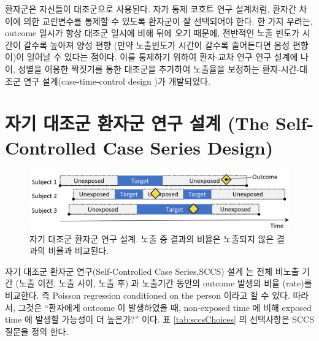 \documentclass[11pt]{book}
\theoremstyle{definition}
\theoremstyle{definition}
\theoremstyle{definition}
\theoremstyle{remark}
\begin{document}
환자군은 자신들이 대조군으로 사용된다. 자가 통제 코호트 연구 설계처럼,
환자간 차이에 의한 교란변수를 통제할 수 있도록 환자군이 잘 선택되어야
한다. 한 가지 우려는, outcome 일시가 항상 대조군 일시에 비해 뒤에 오기
때문에, 전반적인 노출 빈도가 시간이 갈수록 높아져 양성 편향 (만약
노출빈도가 시간이 갈수록 줄어든다면 음성 편향이)이 일어날 수 있다는
점이다. 이를 통제하기 위하여 환자-교차 연구 연구 설계에 나이, 성별을
이용한 짝짓기를 통한 대조군을 추가하여 노출율을 보정하는
환자-시간-대조군 연구 설계(case-time-control design
\citep{suissa_1995})가 개발되었다. 

\section{자기 대조군 환자군 연구 설계 (The Self-Controlled Case Series
Design)}\label{-----the-self-controlled-case-series-design}


\begin{figure}[h]

{\centering \includegraphics[width=0.9\linewidth]{images/PopulationLevelEstimation/selfControlledCaseSeries} 

}

\caption{자기 대조군 환자군 연구 설계. 노출 중 결과의 비율은 노출되지 않은 결과의 비율과 비교된다.}\label{fig:selfControlledCaseSeries}
\end{figure}

자기 대조군 환자군 연구(Self-Controlled Case Series,SCCS) 설계
\citep{farrington_1995, whitaker_2006}는 전체 비노출 기간 (노출 이전,
노출 사이, 노출 후) 과 노출기간 동안의 outcome 발생의 비율 (rate)를
비교한다. 즉 Poisson regression conditioned on the person 이라고 할 수
있다. 따라서, 그것은 ``환자에게 outcome 이 발생하였을 때, non-exposed
time 에 비해 exposed time 에 발생할 가능성이 더 높은가?'' 이다. 표
\ref{tab:sccsChoices} 의 선택사항은 SCCS 질문을 정의
한다.
\end{document}
